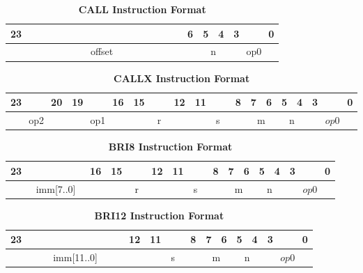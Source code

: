 \begin{table}[H]
	\caption{\textbf{CALL Instruction Format}}
	\begin{tabular}{llllllllllllllllllllllll}
		23 & & & & & & & & & & & & & & & & & 6 & 5 & 4 & 3 & & & 0 \\
		\hline
		\multicolumn{18}{|c|}{offset} & \multicolumn{2}{c|}{n} & \multicolumn{4}{c|}{op0}\\
		\hline
	\end{tabular}
\end{table}

\begin{table}[H]
	\caption{\textbf{CALLX Instruction Format}}
	\begin{tabular}{llllllllllllllllllllllll}
		23 & & & 20 & 19 & & & 16 & 15 & & & 12 & 11 & & & 8 & 7 & 6 & 5 & 4 & 3 & & & 0 \\
		\hline
		\multicolumn{4}{|c|}{op2} & \multicolumn{4}{c|}{op1} & \multicolumn{4}{c|}{r} & \multicolumn{4}{c|}{s} & \multicolumn{2}{c|}{m} & \multicolumn{2}{c|}{n} & \multicolumn{4}{c|}{$op0$}\\
		\hline
	\end{tabular}
\end{table}

\begin{table}[H]
	\caption{\textbf{BRI8 Instruction Format}}
	\begin{tabular}{llllllllllllllllllllllll}
		23 & & & & & & & 16 & 15 & & & 12 & 11 & & & 8 & 7 & 6 & 5 & 4 & 3 & & & 0 \\
		\hline
		\multicolumn{8}{|c|}{imm[7..0]} & \multicolumn{4}{c|}{r} & \multicolumn{4}{c|}{s} & \multicolumn{2}{c|}{m} & \multicolumn{2}{c|}{n} & \multicolumn{4}{c|}{$op0$}\\
		\hline
	\end{tabular}
\end{table}

\begin{table}[H]
	\caption{\textbf{BRI12 Instruction Format}}
	\begin{tabular}{llllllllllllllllllllllll}
		23 & & & & & & & & & & & 12 & 11 & & & 8 & 7 & 6 & 5 & 4 & 3 & & & 0 \\
		\hline
		\multicolumn{12}{|c|}{imm[11..0]} & \multicolumn{4}{c|}{s} & \multicolumn{2}{c|}{m} & \multicolumn{2}{c|}{n} & \multicolumn{4}{c|}{$op0$}\\
		\hline
	\end{tabular}
\end{table}

